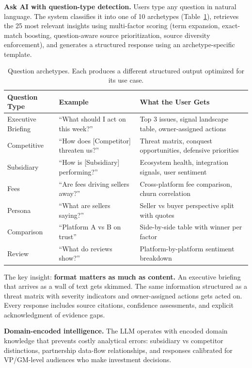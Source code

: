 \documentclass[11pt]{article}
\begin{document}
\textbf{Ask AI with question-type detection.} Users type any question in natural language. The system classifies it into one of 10 archetypes (Table~\ref{tab:qtypes}), retrieves the 25 most relevant insights using multi-factor scoring (term expansion, exact-match boosting, question-aware source prioritization, source diversity enforcement), and generates a structured response using an archetype-specific template.

\begin{table}[H]
\centering
\small
\begin{tabular}{@{}llp{4.2cm}@{}}
\toprule
\textbf{Question Type} & \textbf{Example} & \textbf{What the User Gets} \\
\midrule
Executive Briefing & ``What should I act on this week?'' & Top 3 issues, signal landscape table, owner-assigned actions \\
Competitive & ``How does [Competitor] threaten us?'' & Threat matrix, conquest opportunities, defensive priorities \\
Subsidiary & ``How is [Subsidiary] performing?'' & Ecosystem health, integration signals, user sentiment \\
Fees & ``Are fees driving sellers away?'' & Cross-platform fee comparison, churn correlation \\
Persona & ``What are sellers saying?'' & Seller vs buyer perspective split with quotes \\
Comparison & ``Platform A vs B on trust'' & Side-by-side table with winner per factor \\
Review & ``What do reviews show?'' & Platform-by-platform sentiment breakdown \\
\bottomrule
\end{tabular}
\caption{Question archetypes. Each produces a different structured output optimized for its use case.}
\label{tab:qtypes}
\end{table}

The key insight: \textbf{format matters as much as content.} An executive briefing that arrives as a wall of text gets skimmed. The same information structured as a threat matrix with severity indicators and owner-assigned actions gets acted on. Every response includes source citations, confidence assessments, and explicit acknowledgment of evidence gaps.

\textbf{Domain-encoded intelligence.} The LLM operates with encoded domain knowledge that prevents costly analytical errors: subsidiary vs competitor distinctions, partnership data-flow relationships, and responses calibrated for VP/GM-level audiences who make investment decisions.
\end{document}
